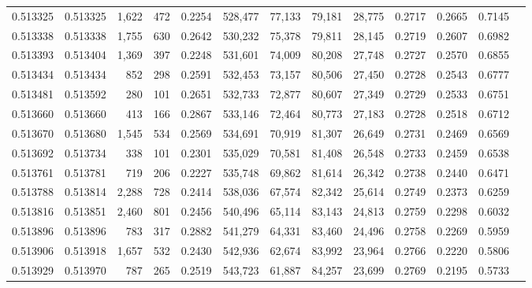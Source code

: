 \begin{tabular}{rrrrrrrrrrrrr}
0.513325 & 0.513325 & 1,622 &   472 &                                     0.2254 & 528,477 &  77,133 &  79,181 &  28,775 & 0.2717 & 0.2665 & 0.7145 \\
0.513338 & 0.513338 & 1,755 &   630 &                                     0.2642 & 530,232 &  75,378 &  79,811 &  28,145 & 0.2719 & 0.2607 & 0.6982 \\
0.513393 & 0.513404 & 1,369 &   397 &                                     0.2248 & 531,601 &  74,009 &  80,208 &  27,748 & 0.2727 & 0.2570 & 0.6855 \\
0.513434 & 0.513434 &   852 &   298 &                                     0.2591 & 532,453 &  73,157 &  80,506 &  27,450 & 0.2728 & 0.2543 & 0.6777 \\
0.513481 & 0.513592 &   280 &   101 &                                     0.2651 & 532,733 &  72,877 &  80,607 &  27,349 & 0.2729 & 0.2533 & 0.6751 \\
0.513660 & 0.513660 &   413 &   166 &                                     0.2867 & 533,146 &  72,464 &  80,773 &  27,183 & 0.2728 & 0.2518 & 0.6712 \\
0.513670 & 0.513680 & 1,545 &   534 &                                     0.2569 & 534,691 &  70,919 &  81,307 &  26,649 & 0.2731 & 0.2469 & 0.6569 \\
0.513692 & 0.513734 &   338 &   101 &                                     0.2301 & 535,029 &  70,581 &  81,408 &  26,548 & 0.2733 & 0.2459 & 0.6538 \\
0.513761 & 0.513781 &   719 &   206 &                                     0.2227 & 535,748 &  69,862 &  81,614 &  26,342 & 0.2738 & 0.2440 & 0.6471 \\
0.513788 & 0.513814 & 2,288 &   728 &                                     0.2414 & 538,036 &  67,574 &  82,342 &  25,614 & 0.2749 & 0.2373 & 0.6259 \\
0.513816 & 0.513851 & 2,460 &   801 &                                     0.2456 & 540,496 &  65,114 &  83,143 &  24,813 & 0.2759 & 0.2298 & 0.6032 \\
0.513896 & 0.513896 &   783 &   317 &                                     0.2882 & 541,279 &  64,331 &  83,460 &  24,496 & 0.2758 & 0.2269 & 0.5959 \\
0.513906 & 0.513918 & 1,657 &   532 &                                     0.2430 & 542,936 &  62,674 &  83,992 &  23,964 & 0.2766 & 0.2220 & 0.5806 \\
0.513929 & 0.513970 &   787 &   265 &                                     0.2519 & 543,723 &  61,887 &  84,257 &  23,699 & 0.2769 & 0.2195 & 0.5733 \\

\end{tabular}
